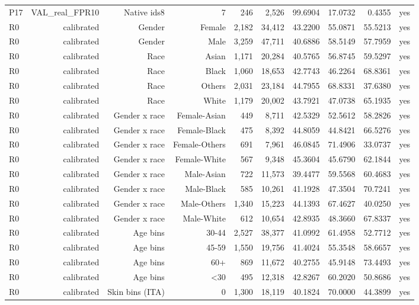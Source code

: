 \documentclass[10pt]{article}
\begin{document}
\begin{longtable}{@{}lrrrrrrrrr@{}}
P17 & VAL\_real\_FPR10 & Native ids8 & 7 & 246 & 2,526 & 99.6904 & 17.0732 & 0.4355 & yes \\
R0 & calibrated & Gender & Female & 2,182 & 34,412 & 43.2200 & 55.0871 & 55.5213 & yes \\
R0 & calibrated & Gender & Male & 3,259 & 47,711 & 40.6886 & 58.5149 & 57.7959 & yes \\
R0 & calibrated & Race & Asian & 1,171 & 20,284 & 40.5765 & 56.8745 & 59.5297 & yes \\
R0 & calibrated & Race & Black & 1,060 & 18,653 & 42.7743 & 46.2264 & 68.8361 & yes \\
R0 & calibrated & Race & Others & 2,031 & 23,184 & 44.7955 & 68.8331 & 37.6380 & yes \\
R0 & calibrated & Race & White & 1,179 & 20,002 & 43.7921 & 47.0738 & 65.1935 & yes \\
R0 & calibrated & Gender x race & Female-Asian & 449 & 8,711 & 42.5329 & 52.5612 & 58.2826 & yes \\
R0 & calibrated & Gender x race & Female-Black & 475 & 8,392 & 44.8059 & 44.8421 & 66.5276 & yes \\
R0 & calibrated & Gender x race & Female-Others & 691 & 7,961 & 46.0845 & 71.4906 & 33.0737 & yes \\
R0 & calibrated & Gender x race & Female-White & 567 & 9,348 & 45.3604 & 45.6790 & 62.1844 & yes \\
R0 & calibrated & Gender x race & Male-Asian & 722 & 11,573 & 39.4477 & 59.5568 & 60.4683 & yes \\
R0 & calibrated & Gender x race & Male-Black & 585 & 10,261 & 41.1928 & 47.3504 & 70.7241 & yes \\
R0 & calibrated & Gender x race & Male-Others & 1,340 & 15,223 & 44.1393 & 67.4627 & 40.0250 & yes \\
R0 & calibrated & Gender x race & Male-White & 612 & 10,654 & 42.8935 & 48.3660 & 67.8337 & yes \\
R0 & calibrated & Age bins & 30-44 & 2,527 & 38,377 & 41.0992 & 61.4958 & 52.7712 & yes \\
R0 & calibrated & Age bins & 45-59 & 1,550 & 19,756 & 41.4024 & 55.3548 & 58.6657 & yes \\
R0 & calibrated & Age bins & 60+ & 869 & 11,672 & 40.2755 & 45.9148 & 73.4493 & yes \\
R0 & calibrated & Age bins & \textless{}30 & 495 & 12,318 & 42.8267 & 60.2020 & 50.8686 & yes \\
R0 & calibrated & Skin bins (ITA) & 0 & 1,300 & 18,119 & 40.1824 & 70.0000 & 44.3899 & yes \\

\end{longtable}
\end{document}
